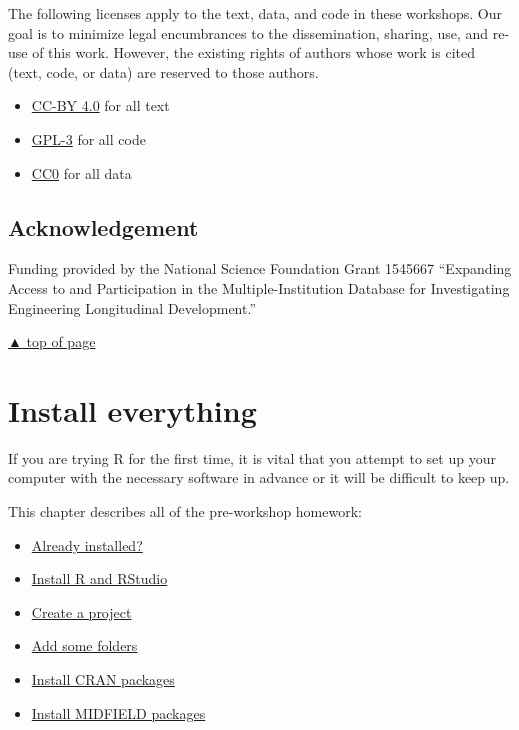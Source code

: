 \documentclass[
]{book}
\providecommand{\tightlist}{%
  \setlength{\itemsep}{0pt}\setlength{\parskip}{0pt}}
\begin{document}
The following licenses apply to the text, data, and code in these workshops. Our goal is to minimize legal encumbrances to the dissemination, sharing, use, and re-use of this work. However, the existing rights of authors whose work is cited (text, code, or data) are reserved to those authors.

\begin{itemize}
\tightlist
\item
  \href{https://creativecommons.org/licenses/by/4.0/legalcode}{CC-BY 4.0} for all text\\
\item
  \href{https://www.r-project.org/Licenses/GPL-3}{GPL-3} for all code\\
\item
  \href{https://wiki.creativecommons.org/wiki/CC0_use_for_data}{CC0} for all data
\end{itemize}

\hypertarget{acknowledgement}{%
\section{Acknowledgement}\label{acknowledgement}}

Funding provided by the National Science Foundation Grant 1545667 ``Expanding Access to and Participation in the Multiple-Institution Database for Investigating Engineering Longitudinal Development.''

\protect\hyperlink{introduction}{▲ top of page}

\hypertarget{install-everything}{%
\chapter{Install everything}\label{install-everything}}

If you are trying R for the first time, it is vital that you attempt to set up your computer with the necessary software in advance or it will be difficult to keep up.

This chapter describes all of the pre-workshop homework:

\begin{itemize}
\tightlist
\item
  \protect\hyperlink{already-installed}{Already installed?}
\item
  \protect\hyperlink{install-r-and-rstudio}{Install R and RStudio}
\item
  \protect\hyperlink{create-a-project}{Create a project}\\
\item
  \protect\hyperlink{add-some-folders}{Add some folders}
\item
  \protect\hyperlink{install-cran-packages}{Install CRAN packages}
\item
  \protect\hyperlink{install-midfield-packages}{Install MIDFIELD packages}
\end{itemize}
\end{document}
